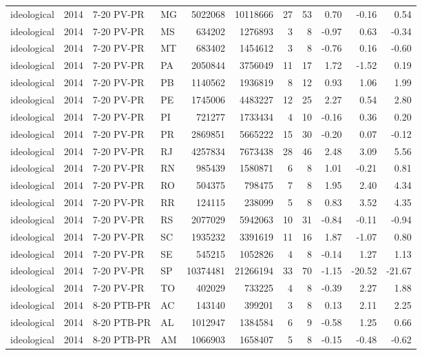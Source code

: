 \begin{landscape}
\begin{longtable}{lllL{1.4cm}rrrrrrr}
ideological & 2014 & 7-20 PV-PR & MG & 5022068 & 10118666 & 27 & 53 & 0.70 & -0.16 & 0.54 \\
ideological & 2014 & 7-20 PV-PR & MS & 634202 & 1276893 & 3 & 8 & -0.97 & 0.63 & -0.34 \\
ideological & 2014 & 7-20 PV-PR & MT & 683402 & 1454612 & 3 & 8 & -0.76 & 0.16 & -0.60 \\
ideological & 2014 & 7-20 PV-PR & PA & 2050844 & 3756049 & 11 & 17 & 1.72 & -1.52 & 0.19 \\
ideological & 2014 & 7-20 PV-PR & PB & 1140562 & 1936819 & 8 & 12 & 0.93 & 1.06 & 1.99 \\
ideological & 2014 & 7-20 PV-PR & PE & 1745006 & 4483227 & 12 & 25 & 2.27 & 0.54 & 2.80 \\
ideological & 2014 & 7-20 PV-PR & PI & 721277 & 1733434 & 4 & 10 & -0.16 & 0.36 & 0.20 \\
ideological & 2014 & 7-20 PV-PR & PR & 2869851 & 5665222 & 15 & 30 & -0.20 & 0.07 & -0.12 \\
ideological & 2014 & 7-20 PV-PR & RJ & 4257834 & 7673438 & 28 & 46 & 2.48 & 3.09 & 5.56 \\
ideological & 2014 & 7-20 PV-PR & RN & 985439 & 1580871 & 6 & 8 & 1.01 & -0.21 & 0.81 \\
ideological & 2014 & 7-20 PV-PR & RO & 504375 & 798475 & 7 & 8 & 1.95 & 2.40 & 4.34 \\
ideological & 2014 & 7-20 PV-PR & RR & 124115 & 238099 & 5 & 8 & 0.83 & 3.52 & 4.35 \\
ideological & 2014 & 7-20 PV-PR & RS & 2077029 & 5942063 & 10 & 31 & -0.84 & -0.11 & -0.94 \\
ideological & 2014 & 7-20 PV-PR & SC & 1935232 & 3391619 & 11 & 16 & 1.87 & -1.07 & 0.80 \\
ideological & 2014 & 7-20 PV-PR & SE & 545215 & 1052826 & 4 & 8 & -0.14 & 1.27 & 1.13 \\
ideological & 2014 & 7-20 PV-PR & SP & 10374481 & 21266194 & 33 & 70 & -1.15 & -20.52 & -21.67 \\
ideological & 2014 & 7-20 PV-PR & TO & 402029 & 733225 & 4 & 8 & -0.39 & 2.27 & 1.88 \\
ideological & 2014 & 8-20 PTB-PR & AC & 143140 & 399201 & 3 & 8 & 0.13 & 2.11 & 2.25 \\
ideological & 2014 & 8-20 PTB-PR & AL & 1012947 & 1384584 & 6 & 9 & -0.58 & 1.25 & 0.66 \\
ideological & 2014 & 8-20 PTB-PR & AM & 1066903 & 1658407 & 5 & 8 & -0.15 & -0.48 & -0.62 \\

\end{longtable}
\end{landscape}
